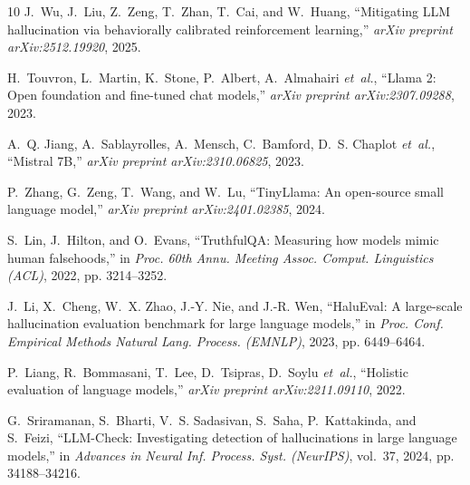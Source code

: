 \documentclass[journal]{IEEEtran}
\begin{document}
\begin{thebibliography}{10}
J.~Wu, J.~Liu, Z.~Zeng, T.~Zhan, T.~Cai, and W.~Huang, ``Mitigating LLM hallucination via behaviorally calibrated reinforcement learning,'' \emph{arXiv preprint arXiv:2512.19920}, 2025.

H.~Touvron, L.~Martin, K.~Stone, P.~Albert, A.~Almahairi \emph{et~al.}, ``Llama 2: Open foundation and fine-tuned chat models,'' \emph{arXiv preprint arXiv:2307.09288}, 2023.

A.~Q. Jiang, A.~Sablayrolles, A.~Mensch, C.~Bamford, D.~S. Chaplot \emph{et~al.}, ``Mistral 7B,'' \emph{arXiv preprint arXiv:2310.06825}, 2023.

P.~Zhang, G.~Zeng, T.~Wang, and W.~Lu, ``TinyLlama: An open-source small language model,'' \emph{arXiv preprint arXiv:2401.02385}, 2024.

S.~Lin, J.~Hilton, and O.~Evans, ``TruthfulQA: Measuring how models mimic human falsehoods,'' in \emph{Proc. 60th Annu. Meeting Assoc. Comput. Linguistics (ACL)}, 2022, pp. 3214--3252.

J.~Li, X.~Cheng, W.~X. Zhao, J.-Y. Nie, and J.-R. Wen, ``HaluEval: A large-scale hallucination evaluation benchmark for large language models,'' in \emph{Proc. Conf. Empirical Methods Natural Lang. Process. (EMNLP)}, 2023, pp. 6449--6464.

P.~Liang, R.~Bommasani, T.~Lee, D.~Tsipras, D.~Soylu \emph{et~al.}, ``Holistic evaluation of language models,'' \emph{arXiv preprint arXiv:2211.09110}, 2022.

G.~Sriramanan, S.~Bharti, V.~S. Sadasivan, S.~Saha, P.~Kattakinda, and S.~Feizi, ``LLM-Check: Investigating detection of hallucinations in large language models,'' in \emph{Advances in Neural Inf. Process. Syst. (NeurIPS)}, vol.~37, 2024, pp. 34188--34216.

\end{thebibliography}
\end{document}
